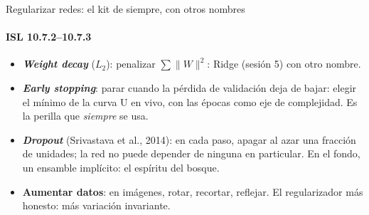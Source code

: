 \documentclass{beamer}
\newcommand{\1}{\mathbb{I}}
\begin{document}
\begin{frame}{Regularizar redes: el kit de siempre, con otros nombres}
\framesubtitle{ISL 10.7.2--10.7.3}
\small
\begin{center}
\end{center}
\pause
\begin{itemize}\itemsep2pt
  \item \textbf{\emph{Weight decay}} ($L_2$): penalizar $\sum \|W\|^2$: Ridge (sesión 5) con otro nombre.
  \item \textbf{\emph{Early stopping}}: parar cuando la pérdida de validación deja de bajar: elegir el mínimo de la curva U en vivo, con las épocas como eje de complejidad. Es la perilla que \emph{siempre} se usa.
  \item \textbf{\emph{Dropout}} (Srivastava et al., 2014): en cada paso, apagar al azar una fracción de unidades; la red no puede depender de ninguna en particular. En el fondo, un ensamble implícito: el espíritu del bosque.
  \item \textbf{Aumentar datos}: en imágenes, rotar, recortar, reflejar. El regularizador más honesto: más variación invariante.
\end{itemize}
\end{frame}
\end{document}
